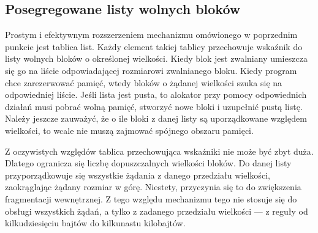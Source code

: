 \documentclass[12pt,a4paper,titlepage,twoside]{mwart}
\begin{document}
\subsection{Posegregowane listy wolnych bloków}

Prostym i efektywnym rozszerzeniem mechanizmu omówionego w poprzednim punkcie
jest tablica list. Każdy element takiej tablicy przechowuje wskaźnik do listy
wolnych bloków o określonej wielkości. Kiedy blok jest zwalniany umieszcza się
go na liście odpowiadającej rozmiarowi zwalnianego bloku. Kiedy program chce
zarezerwować pamięć, wtedy bloków o żądanej wielkości szuka się na odpowiedniej
liście. Jeśli lista jest pusta, to alokator przy pomocy odpowiednich działań
musi pobrać wolną pamięć, stworzyć nowe bloki i uzupełnić pustą listę.  Należy
jeszcze zauważyć, że o ile bloki z danej listy są uporządkowane względem
wielkości, to wcale nie muszą zajmować spójnego obszaru pamięci.

Z oczywistych względów tablica przechowująca wskaźniki nie może być zbyt duża.
Dlatego ogranicza się liczbę dopuszczalnych wielkości bloków. Do danej listy
przyporządkowuje się wszystkie żądania z danego przedziału wielkości,
zaokrąglając żądany rozmiar w górę. Niestety, przyczynia się to do zwiększenia
fragmentacji wewnętrznej. Z tego względu mechanizmu tego nie stosuje się do
obsługi wszystkich żądań, a tylko z zadanego przedziału wielkości --- z reguły
od kilkudziesięciu bajtów do kilkunastu kilobajtów.
\end{document}
